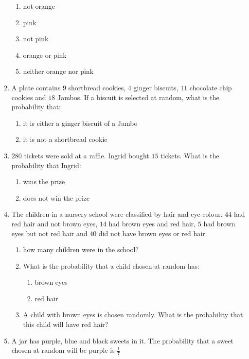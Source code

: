 \begin{eocexercises}{}
\begin{enumerate}[itemsep=5pt, label=\textbf{\arabic*}. ]
\begin{enumerate}[noitemsep, label=\textbf{(\alph*)} ]
    \item not orange
    \item pink
    \item not pink
    \item orange or pink
    \item neither orange nor pink
    \end{enumerate}
  \item A plate contains $9$ shortbread cookies, $4$ ginger biscuits,
    $11$ chocolate chip cookies and $18$ Jambos. If a biscuit is
    selected at random, what is the probability that:
    \begin{enumerate}[noitemsep, label=\textbf{(\alph*)} ]
    \item it is either a ginger biscuit of a Jambo
    \item it is not a shortbread cookie
    \end{enumerate}
  \item $280$ tickets were sold at a raffle. Ingrid bought $15$
    tickets. What is the probability that Ingrid:
    \begin{enumerate}[noitemsep, label=\textbf{(\alph*)} ]
    \item wins the prize
    \item does not win the prize
    \end{enumerate}
  \item The children in a nursery school were classified by hair and
    eye colour. $44$ had red hair and not brown eyes, $14$ had brown eyes
    and red hair, $5$ had brown eyes but not red hair and $40$ did not
    have brown eyes or red hair.
    \begin{enumerate}[noitemsep, label=\textbf{(\alph*)} ]
    \item how many children were in the school?
    \item What is the probability that a child chosen at random has:
      \begin{enumerate}
      \item brown eyes
      \item red hair
      \end{enumerate} 
    \item A child with brown eyes is chosen randomly. What is the
      probability that this child will have red hair?
    \end{enumerate}
  \item A jar has purple, blue and black sweets in it. The probability
    that a sweet chosen at random will be purple is $\frac{1}{7}$

\end{enumerate}
\end{eocexercises}
